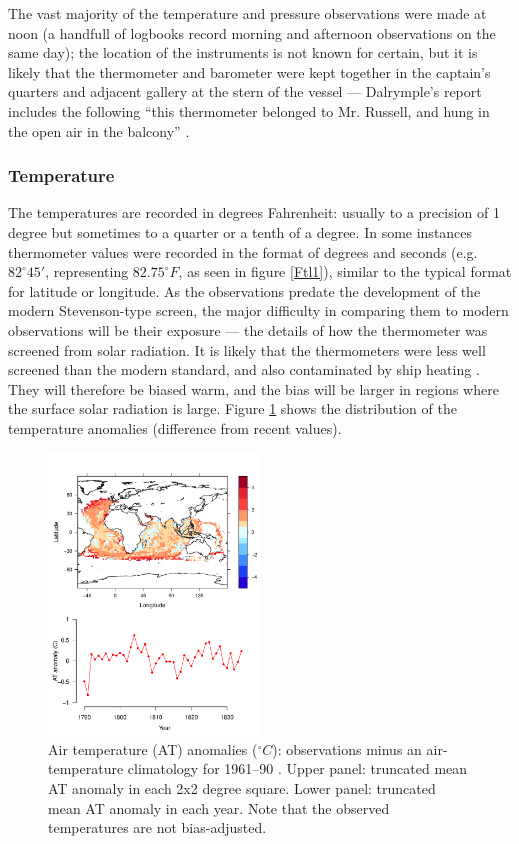\documentclass[CP]{copernicus}
\begin{document}
 The vast majority of the temperature and pressure observations were made at noon (a handfull of logbooks record morning and afternoon observations on the same day); the location of the instruments is not known for certain, but it is likely that the thermometer and barometer were kept together in the captain's quarters and adjacent gallery at the stern of the vessel --- Dalrymple's report includes the following ``this thermometer belonged to Mr. Russell, and hung in the open air in the balcony'' \citep{Dalrymple78}.

\subsubsection{Temperature}

The temperatures are recorded in degrees Fahrenheit: usually to a precision of 1 degree but sometimes to a quarter or a tenth of a degree. In some instances thermometer values were recorded in the format of degrees and seconds (e.g. $82^\circ 45'$, representing $82.75^\circ F$, as seen in figure \ref{Ftl1}), similar to the typical format for latitude or longitude. As the observations predate the development of the modern Stevenson-type screen, the major difficulty in comparing them to modern observations will be their exposure --- the details of how the thermometer was screened from solar radiation. It is likely that the thermometers were less well screened than the modern standard, and also contaminated by ship heating \citep{chenoweth00homogenization,Berry05}. They will therefore be biased warm, and the bias will be larger in regions where the surface solar radiation is large. Figure \ref{pwat1} shows the distribution of the temperature anomalies (difference from recent values).
\begin{figure}[!hbp]
\begin{center}
\includegraphics[angle=0, width=0.5\textwidth]{../figures/temperatures}
\caption{Air temperature (AT) anomalies ($^\circ C$): observations minus an air-temperature climatology for 1961--90 \citep{rayner03HadISST1}. Upper panel: truncated mean AT anomaly in each 2x2 degree square. Lower panel: truncated mean AT anomaly in each year. Note that the observed temperatures are not bias-adjusted.}
\label{pwat1}
\end{center}
\end{figure}
\end{document}

